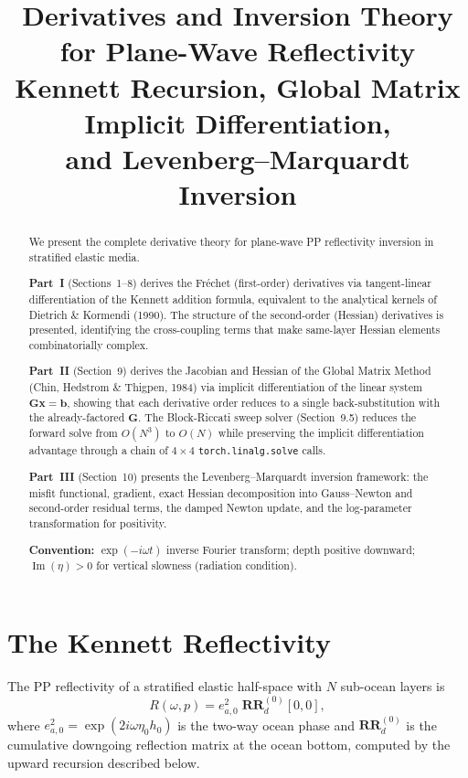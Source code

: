 \documentclass[11pt,a4paper]{article}
\title{%
  Derivatives and Inversion Theory for Plane-Wave Reflectivity\\[6pt]
  \large Kennett Recursion, Global Matrix Implicit Differentiation,\\
  and Levenberg--Marquardt Inversion%
}
\author{}
\date{}
\newcommand{\RR}{\mathbf{RR}}
\theoremstyle{plain}
\theoremstyle{remark}
\begin{document}
\maketitle
\thispagestyle{fancy}

\begin{abstract}
We present the complete derivative theory for plane-wave PP reflectivity
inversion in stratified elastic media.

\textbf{Part~I} (Sections~1--8) derives the Fréchet (first-order) derivatives
via tangent-linear differentiation of the Kennett addition formula, equivalent
to the analytical kernels of Dietrich \& Kormendi (1990).  The structure of
the second-order (Hessian) derivatives is presented, identifying the
cross-coupling terms that make same-layer Hessian elements combinatorially
complex.

\textbf{Part~II} (Section~9) derives the Jacobian and Hessian of the
Global Matrix Method (Chin, Hedstrom \& Thigpen, 1984) via implicit
differentiation of the linear system $\mathbf{G}\mathbf{x} = \mathbf{b}$,
showing that each derivative order reduces to a single back-substitution
with the already-factored $\mathbf{G}$.  The Block-Riccati sweep solver
(Section~9.5) reduces the forward solve from $O(N^3)$ to $O(N)$ while
preserving the implicit differentiation advantage through a chain of
$4\times 4$ \texttt{torch.linalg.solve} calls.

\textbf{Part~III} (Section~10) presents the Levenberg--Marquardt inversion
framework: the misfit functional, gradient, exact Hessian decomposition into
Gauss--Newton and second-order residual terms, the damped Newton update, and
the log-parameter transformation for positivity.

\medskip\noindent
\textbf{Convention:}  $\exp(-i\omega t)$ inverse Fourier transform; depth
positive downward; $\operatorname{Im}(\eta) > 0$ for vertical slowness
(radiation condition).
\end{abstract}

\tableofcontents

\section{The Kennett Reflectivity}

The PP reflectivity of a stratified elastic half-space with $N$ sub-ocean
layers is
\begin{equation}\label{eq:R}
  R(\omega, p)
  = e_{a,0}^{2} \;\RR_d^{(0)}[0,0],
\end{equation}
where $e_{a,0}^{2} = \exp(2i\omega\eta_0 h_0)$ is the two-way ocean phase and
$\RR_d^{(0)}$ is the cumulative downgoing reflection matrix at the ocean
bottom, computed by the upward recursion described below.
\end{document}
